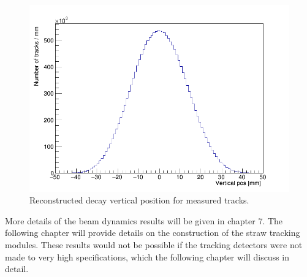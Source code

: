 \begin{figure}[th]
\centering
\includegraphics[scale=0.4]{Figures/VerticalPosition_.png}
\decoRule
\caption{Reconstructed decay vertical position for measured tracks.}
\label{fig:VerticalPosition_}
\end{figure}

More details of the beam dynamics results will be given in chapter 7. The following chapter will provide details on the construction of the straw tracking modules. These results would not be possible if the tracking detectors were not made to very high specifications, which the following chapter will discuss in detail.



